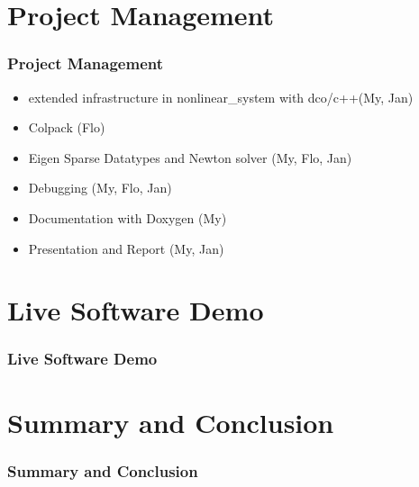 \documentclass[ucs,10pt]{beamer}
\begin{document}
\section{Project Management}

\begin{frame}
\frametitle{Project Management}
	\begin{small}
		\begin{itemize}
		\item extended infrastructure in nonlinear_system with dco/c++(My, Jan)
		\item Colpack (Flo)
		\item Eigen Sparse Datatypes and Newton solver (My, Flo, Jan)
		\item Debugging (My, Flo, Jan)
		\item Documentation with Doxygen (My)
		\item Presentation and Report (My, Jan)
		\end{itemize}
	\end{small}
\end{frame}

\section{Live Software Demo}

\begin{frame}
\frametitle{Live Software Demo} 
\end{frame}

\section{Summary and Conclusion}

\begin{frame}
\frametitle{Summary and Conclusion}
\end{frame}
\end{document}
